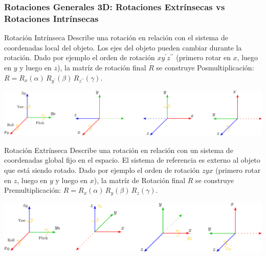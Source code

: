 \begin{frame}
    \frametitle{Rotaciones Generales 3D: Rotaciones Extrínsecas vs Rotaciones Intrínsecas}
    \scriptsize
    \begin{block}{Rotación Intrínseca}
    Describe una rotación en relación con el sistema de coordenadas local del objeto. Los ejes del objeto pueden cambiar durante la rotación. Dado por ejemplo el orden de rotación $xy^{\prime}z^{\prime\prime}$ (primero rotar en $x$, luego en $y$ y luego en $z$), la matríz de rotación final $R$ se construye Posmultiplicación: $R = R_{x}(\alpha) \, R_{y^{\prime}}(\beta) \, R_{z^{\prime\prime}}(\gamma)$.
    \end{block}

    \begin{center}
        \includegraphics[width=0.65\columnwidth]{./images/intrinsic_rotation.pdf}
    \end{center}

    \begin{block}{Rotación Extrínseca}
        Describe una rotación en relación con un sistema de coordenadas global fijo en el espacio. El sistema de referencia es externo al objeto que está siendo rotado. Dado por ejemplo el orden de rotación $zyx$ (primero rotar en $z$, luego en $y$ y luego en $x$), la matríz de Rotación final $R$ se construye Premultiplicación: $R = R_{x}(\alpha) \, R_{y}(\beta) \, R_{z}(\gamma)$.
    \end{block}
    
    \begin{center}
        \includegraphics[width=0.65\columnwidth]{./images/extrinsic_rotation.pdf}
    \end{center}
        
    
    
\end{frame}

